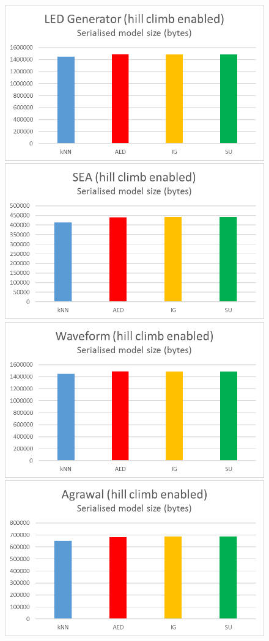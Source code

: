 \begin{figure}[hp]
\centering
\includegraphics[scale=0.17]{Graphs/LED/H_bytes}
\includegraphics[scale=0.17]{Graphs/SEA/H_bytes}
\includegraphics[scale=0.17]{Graphs/Waveform/H_bytes}
\includegraphics[scale=0.17]{Graphs/Agrawal/H_bytes}

\end{figure}
